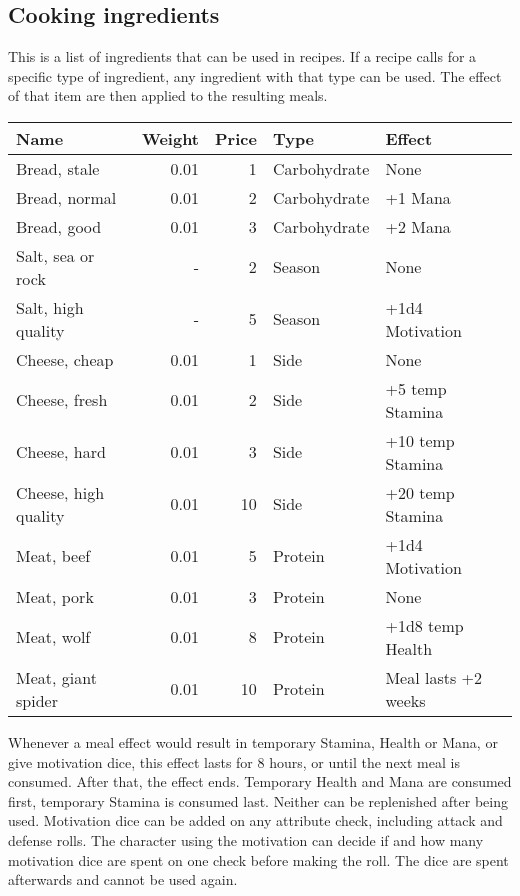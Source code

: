 \subsection{Cooking ingredients}
This is a list of ingredients that can be used in recipes. If a recipe calls for a specific type of ingredient, any ingredient with that type can be used. The effect of that item are then applied to the resulting meals. 
\begin{longtable}{l | r | r | l | p{3cm} }
	Name & Weight & Price & Type & Effect\\ \hline
	Bread, stale & 0.01 & 1 & Carbohydrate & None\\
	Bread, normal & 0.01 & 2 & Carbohydrate & +1 Mana\\
	Bread, good & 0.01 & 3 & Carbohydrate & +2 Mana\\
	Salt, sea or rock & - & 2 & Season & None\\
	Salt, high quality & - & 5 & Season & +1d4 Motivation\\
	Cheese, cheap & 0.01 & 1 & Side & None\\
	Cheese, fresh & 0.01 & 2 & Side & +5 temp Stamina\\
	Cheese, hard & 0.01 & 3 & Side & +10 temp Stamina\\
	Cheese, high quality & 0.01 & 10 & Side & +20 temp Stamina\\
	Meat, beef & 0.01 & 5 & Protein & +1d4 Motivation\\
	Meat, pork & 0.01 & 3 & Protein & None \\
	Meat, wolf & 0.01 & 8 & Protein & +1d8 temp Health\\
	Meat, giant spider & 0.01 & 10 & Protein & Meal lasts +2 weeks\\ 
\end{longtable}

Whenever a meal effect would result in temporary Stamina, Health or Mana, or give motivation dice, this effect lasts for 8 hours, or until the next meal is consumed. After that, the effect ends. Temporary Health and Mana are consumed first, temporary Stamina is consumed last. Neither can be replenished after being used.
Motivation dice can be added on any attribute check, including attack and defense rolls. The character using the motivation can decide if and how many motivation dice are spent on one check before making the roll. The dice are spent afterwards and cannot be used again.\\

